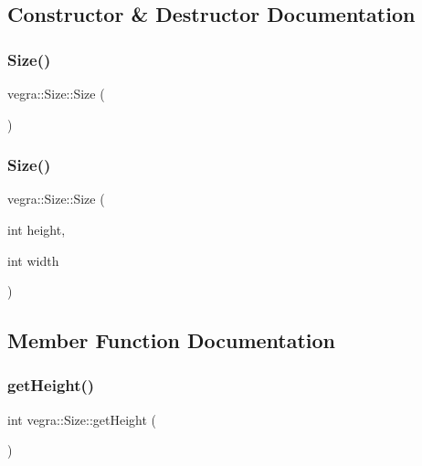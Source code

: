 \subsection{Constructor \& Destructor Documentation}
\mbox{\label{structvegra_1_1Size_a6d5058f3d438e24fca92f3c261ecd7a8}} 
\subsubsection{\texorpdfstring{Size()}{Size()}\hspace{0.1cm}{\footnotesize\ttfamily [1/2]}}
{\footnotesize\ttfamily vegra\+::\+Size\+::\+Size (\begin{DoxyParamCaption}{ }\end{DoxyParamCaption})\hspace{0.3cm}{\ttfamily [inline]}}

\mbox{\label{structvegra_1_1Size_af92638bf9795f8c562cc7424f212e985}} 
\subsubsection{\texorpdfstring{Size()}{Size()}\hspace{0.1cm}{\footnotesize\ttfamily [2/2]}}
{\footnotesize\ttfamily vegra\+::\+Size\+::\+Size (\begin{DoxyParamCaption}\item[{int}]{height,  }\item[{int}]{width }\end{DoxyParamCaption})\hspace{0.3cm}{\ttfamily [inline]}}



\subsection{Member Function Documentation}
\mbox{\label{structvegra_1_1Size_a58e78996257b9b625babb0c217767759}} 
\subsubsection{\texorpdfstring{get\+Height()}{getHeight()}}
{\footnotesize\ttfamily int vegra\+::\+Size\+::get\+Height (\begin{DoxyParamCaption}{ }\end{DoxyParamCaption})\hspace{0.3cm}{\ttfamily [inline]}}


